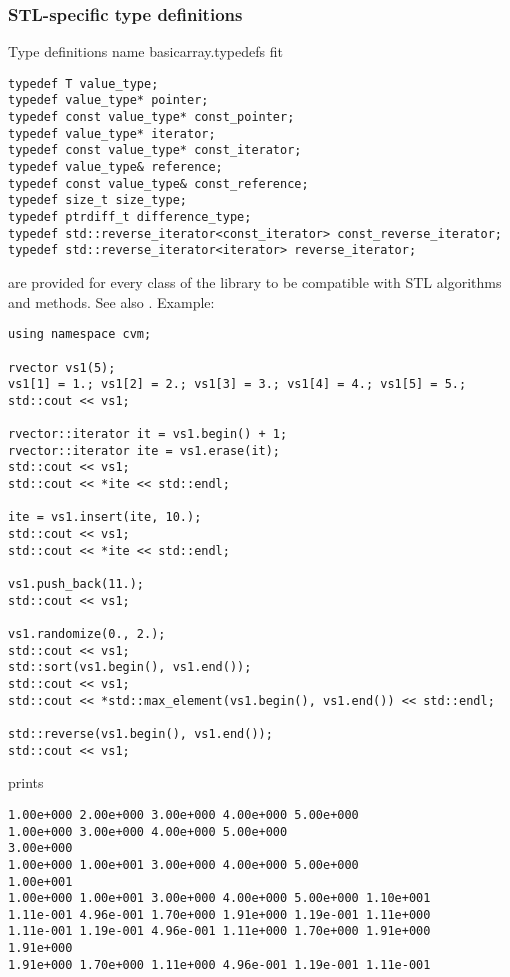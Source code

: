 \subsubsection{STL-specific type definitions}
Type definitions%
\pdfdest name {basicarray.typedefs} fit
\begin{verbatim}
typedef T value_type;
typedef value_type* pointer;
typedef const value_type* const_pointer;
typedef value_type* iterator;
typedef const value_type* const_iterator;
typedef value_type& reference;
typedef const value_type& const_reference;
typedef size_t size_type;
typedef ptrdiff_t difference_type;
typedef std::reverse_iterator<const_iterator> const_reverse_iterator;
typedef std::reverse_iterator<iterator> reverse_iterator;
\end{verbatim}
are provided for every class of the library to be compatible 
with STL algorithms and methods. See also 
.
Example:
\begin{Verbatim}
using namespace cvm;

rvector vs1(5);
vs1[1] = 1.; vs1[2] = 2.; vs1[3] = 3.; vs1[4] = 4.; vs1[5] = 5.;
std::cout << vs1;

rvector::iterator it = vs1.begin() + 1;
rvector::iterator ite = vs1.erase(it);
std::cout << vs1;
std::cout << *ite << std::endl;

ite = vs1.insert(ite, 10.);
std::cout << vs1;
std::cout << *ite << std::endl;

vs1.push_back(11.);
std::cout << vs1;

vs1.randomize(0., 2.);
std::cout << vs1;
std::sort(vs1.begin(), vs1.end());
std::cout << vs1;
std::cout << *std::max_element(vs1.begin(), vs1.end()) << std::endl;

std::reverse(vs1.begin(), vs1.end());
std::cout << vs1;
\end{Verbatim}
prints
\begin{Verbatim}
1.00e+000 2.00e+000 3.00e+000 4.00e+000 5.00e+000
1.00e+000 3.00e+000 4.00e+000 5.00e+000
3.00e+000
1.00e+000 1.00e+001 3.00e+000 4.00e+000 5.00e+000
1.00e+001
1.00e+000 1.00e+001 3.00e+000 4.00e+000 5.00e+000 1.10e+001
1.11e-001 4.96e-001 1.70e+000 1.91e+000 1.19e-001 1.11e+000
1.11e-001 1.19e-001 4.96e-001 1.11e+000 1.70e+000 1.91e+000
1.91e+000
1.91e+000 1.70e+000 1.11e+000 4.96e-001 1.19e-001 1.11e-001
\end{Verbatim}
\newpage


